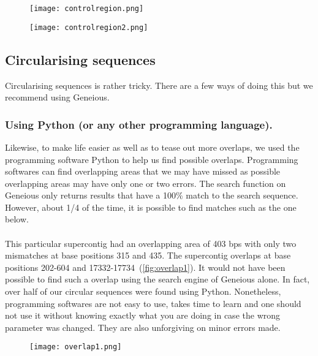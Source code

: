 \documentclass[11pt]{article}
\begin{document}
\begin{figure}[H]
  \centering
    \texttt{[image: controlregion.png]}
  \label{fig:controlregion}
\end{figure}

\begin{figure}[H]
  \centering
    \texttt{[image: controlregion2.png]}
  \label{fig:controlregion2}
\end{figure}

\subsection{Circularising sequences}\label{subsubsec:circularising}
Circularising sequences is rather tricky. There are a few ways of doing this but we recommend using Geneious.

\subsubsection{Using Python (or any other programming language). }
Likewise, to make life easier as well as to tease out more overlaps, we used the programming software Python to help us find possible overlaps. Programming softwares can find overlapping areas that we may have missed as possible overlapping areas may have only one or two errors. The search function on Geneious only returns results that have a 100$\%$ match to the search sequence. However, about 1/4 of the time, it is possible to find matches such as the one below. 
\\
\\
This particular supercontig had an overlapping area of 403 bps with only two mismatches at base positions 315 and 435. The supercontig overlaps at base positions 202-604 and 17332-17734~(\autoref{fig:overlap1}). It would not have been possible to find such a overlap using the search engine of Geneious alone. In fact, over half of our circular sequences were found using Python. Nonetheless, programming softwares are not easy to use, takes time to learn and one should not use it without knowing exactly what you are doing in case the wrong parameter was changed. They are also unforgiving on minor errors made.

\begin{figure}[H]
  \centering
    \texttt{[image: overlap1.png]}
  \label{fig:overlap1}
\end{figure}
\end{document}
